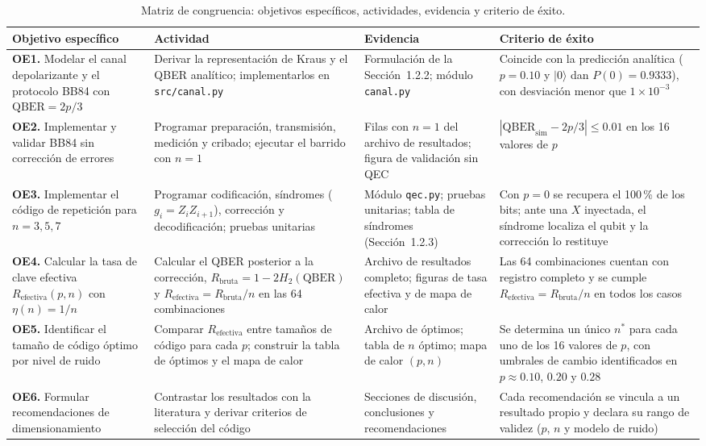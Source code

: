 \documentclass[12pt]{report}
\begin{document}
\begin{table}[H]
\centering
\caption{Matriz de congruencia: objetivos específicos, actividades, evidencia y criterio de éxito.}
\label{tab:matriz}
\footnotesize
\begin{tabular}{@{}>{\raggedright\arraybackslash}p{3.3cm}>{\raggedright\arraybackslash}p{3.8cm}>{\raggedright\arraybackslash}p{3.4cm}>{\raggedright\arraybackslash}p{3.6cm}@{}}
\toprule
\textbf{Objetivo específico} & \textbf{Actividad} & \textbf{Evidencia} & \textbf{Criterio de éxito} \\
\midrule
\textbf{OE1.} Modelar el canal depolarizante y el protocolo BB84 con
$\mathrm{QBER} = 2p/3$
& Derivar la representación de Kraus y el QBER analítico; implementarlos en
\texttt{src/canal.py}
& Formulación de la Sección~1.2.2; módulo \texttt{canal.py}
& Coincide con la predicción analítica ($p=0.10$ y $|0\rangle$ dan
$P(0)=0.9333$), con desviación menor que $1\times10^{-3}$ \\
\addlinespace
\textbf{OE2.} Implementar y validar BB84 sin corrección de errores
& Programar preparación, transmisión, medición y cribado; ejecutar el barrido
con $n=1$
& Filas con $n=1$ del archivo de resultados; figura de validación sin QEC
& $|\mathrm{QBER}_{\text{sim}} - 2p/3| \leq 0.01$ en los 16 valores de $p$ \\
\addlinespace
\textbf{OE3.} Implementar el código de repetición para $n=3,5,7$
& Programar codificación, síndromes ($g_i = Z_iZ_{i+1}$), corrección y
decodificación; pruebas unitarias
& Módulo \texttt{qec.py}; pruebas unitarias; tabla de síndromes (Sección~1.2.3)
& Con $p=0$ se recupera el 100\,\% de los bits; ante una $X$ inyectada, el
síndrome localiza el qubit y la corrección lo restituye \\
\addlinespace
\textbf{OE4.} Calcular la tasa de clave efectiva
$R_{\text{efectiva}}(p,n)$ con $\eta(n)=1/n$
& Calcular el QBER posterior a la corrección, $R_{\text{bruta}} = 1-2H_2(\text{QBER})$
y $R_{\text{efectiva}} = R_{\text{bruta}}/n$ en las 64 combinaciones
& Archivo de resultados completo; figuras de tasa efectiva y de mapa de calor
& Las 64 combinaciones cuentan con registro completo y se cumple
$R_{\text{efectiva}} = R_{\text{bruta}}/n$ en todos los casos \\
\addlinespace
\textbf{OE5.} Identificar el tamaño de código óptimo por nivel de ruido
& Comparar $R_{\text{efectiva}}$ entre tamaños de código para cada $p$;
construir la tabla de óptimos y el mapa de calor
& Archivo de óptimos; tabla de $n$ óptimo; mapa de calor $(p,n)$
& Se determina un único $n^{*}$ para cada uno de los 16 valores de $p$, con
umbrales de cambio identificados en $p \approx 0.10$, $0.20$ y $0.28$ \\
\addlinespace
\textbf{OE6.} Formular recomendaciones de dimensionamiento
& Contrastar los resultados con la literatura y derivar criterios de selección
del código
& Secciones de discusión, conclusiones y recomendaciones
& Cada recomendación se vincula a un resultado propio y declara su rango de
validez ($p$, $n$ y modelo de ruido) \\
\bottomrule
\end{tabular}
\end{table}
\end{document}
